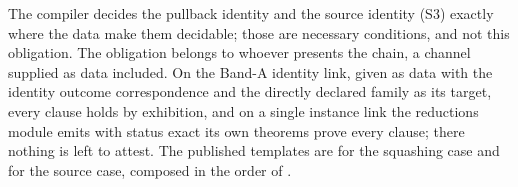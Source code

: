 
The compiler decides the pullback identity and the source identity (S3)
exactly where the data make them decidable; those are necessary conditions,
and not this obligation. The obligation belongs to whoever presents the
chain, a channel supplied as data included. On the Band-A identity link,
given as data with the identity outcome correspondence and the directly
declared family as its target, every clause holds by exhibition, and on a single instance
link the reductions module emits with status exact its own theorems prove
every clause; there nothing is left to attest. The published templates are
\cite[Lemma~9.3, Eqs.~(146)--(147)]{tupkary2026decoy} for the squashing case
and \cite[Lemma~9.1, Eqs.~(138)--(139)]{tupkary2026decoy} for the source
case, composed in the order of \cite[Rem.~9.2]{tupkary2026decoy}.

